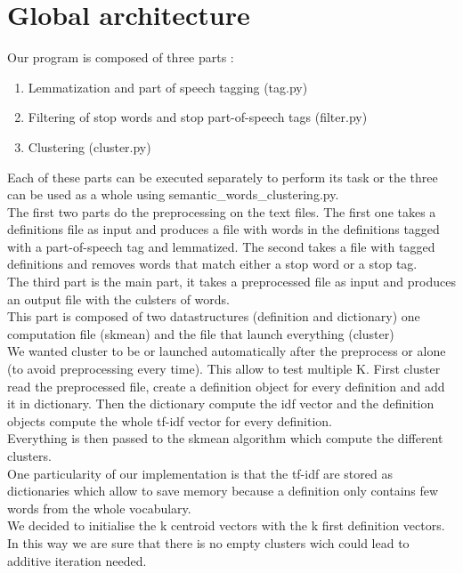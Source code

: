 \documentclass{eplDoc}
\begin{document}
\maketitle
\newpage

\section{Global architecture}

Our program is composed of three parts : 
\begin{enumerate}
	\item Lemmatization and part of speech tagging (tag.py)
	\item Filtering of stop words and stop part-of-speech tags (filter.py)
	\item Clustering (cluster.py) 
\end{enumerate}

Each of these parts can be executed separately to perform its task or the three can be used as a whole using semantic_words_clustering.py. \\ 

The first two parts do the preprocessing on the text files. The first one takes a definitions file as input and produces a file with words in the definitions tagged with a part-of-speech tag and lemmatized. The second takes a file with tagged definitions and removes words that match either a stop word or a stop tag. \\ 

The third part is the main part, it takes a preprocessed file as input and produces an output file with the culsters of words. \\

This part is composed of two datastructures (definition and dictionary) one computation file (skmean) and the file that launch everything (cluster)\\
We wanted cluster to be or launched automatically after the preprocess or alone (to avoid preprocessing every time).  This allow to test multiple K.
First cluster read the preprocessed file, create a definition object for every definition and add it in dictionary.
Then the dictionary compute the idf vector and the definition objects compute the whole tf-idf vector for every definition.
\\
Everything is then passed to the skmean algorithm which compute the different clusters.\\
One particularity of our implementation is that the tf-idf are stored as dictionaries which allow to save memory because a definition only contains few words from the whole vocabulary.
\\
We decided to initialise the k centroid vectors with the k first definition vectors.  In this way we are sure that there is no empty clusters wich could lead to additive iteration needed.
\end{document}
